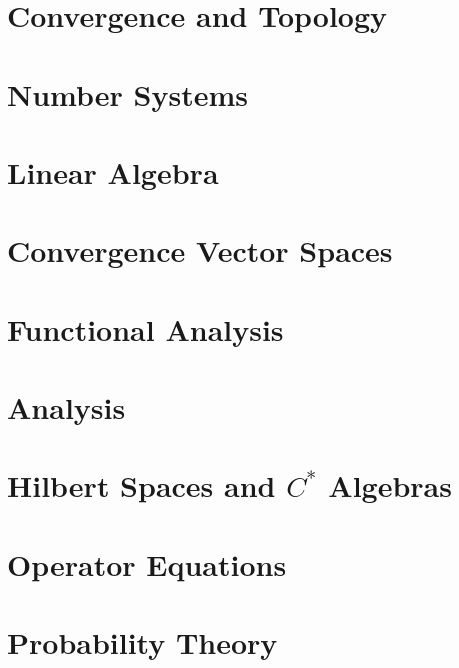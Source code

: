 \documentclass{report}
\begin{document}
\part{Convergence and Topology}
\setcounter{chapter}{0} %


\part{Number Systems}
\setcounter{chapter}{0} %


\part{Linear Algebra}
\setcounter{chapter}{0} %


\part{Convergence Vector Spaces}
\setcounter{chapter}{0} %


\part{Functional Analysis}
\setcounter{chapter}{0} %


\part{Analysis}
\setcounter{chapter}{0} %


\part{Hilbert Spaces and $C^*$ Algebras}
\setcounter{chapter}{0} %


\part{Operator Equations}
\setcounter{chapter}{0} %


\part{Probability Theory}
\setcounter{chapter}{0} %

\end{document}

